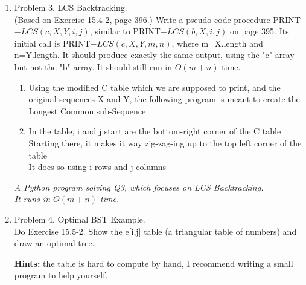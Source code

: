 \documentclass[11pt]{article}
\newtheorem{algorithm}{Algorithm}
\begin{document}
\begin{enumerate}
\begin{algorithm}
\begin{algorithmic}
        \end{algorithmic}
    \end{algorithm}
This runs in O(lg(m+n)) time because with each recursive call, one of the arrays gets reduced by half.\\
This reduces the space taken up, by a log factor

\pagebreak
\item Problem 3. LCS Backtracking.\\
(Based on Exercise 15.4-2, page 396.) Write a pseudo-code procedure PRINT$-LCS(c,X,Y,i,j)$, similar to PRINT$-LCS(b,X,i,j)$ on page 395. Its initial call is PRINT$-LCS(c,X,Y,m,n)$, where m=X.length and n=Y.length. It should produce exactly the same output, using the "c" array but not the "b" array. It should still run in $O(m+n)$ time.

\begin{enumerate}
    \item Using the modified C table which we are supposed to print, and the original sequences X and Y, the following program is meant to create the Longest Common sub-Sequence
    \item In the table, i and j start are the bottom-right corner of the C table\\
    Starting there, it makes it way zig-zag-ing up to the top left corner of the table\\
    It does so using i rows and j columns

\end{enumerate}

    \textit{A Python program solving Q3, which focuses on LCS Backtracking. \\It runs in $O(m+n)$ time.}
    

\pagebreak
\item Problem 4. Optimal BST Example.\\
Do Exercise 15.5-2. Show the e[i,j] table (a triangular table of numbers) and draw an optimal tree.\vspace{0.1cm}

\textbf{Hints: }the table is hard to compute by hand, I recommend writing a small program to help yourself.



\end{enumerate}
\end{document}
